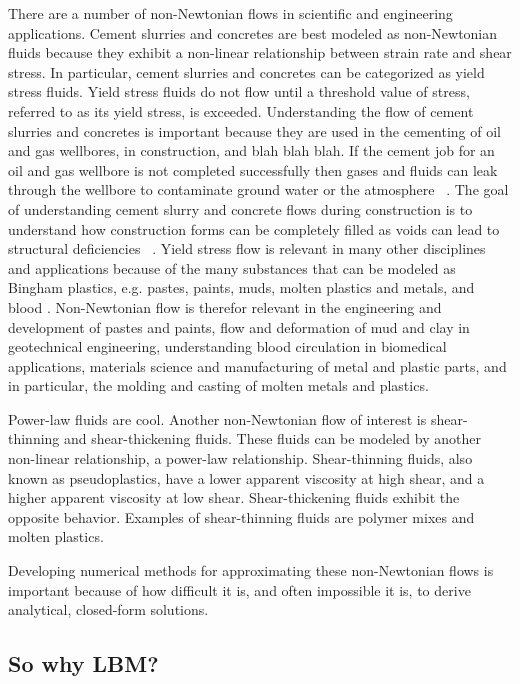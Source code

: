 \documentclass{article}
\begin{document}
There are a number of non-Newtonian flows in scientific and engineering applications.
Cement slurries and concretes are best modeled as non-Newtonian fluids because they exhibit a non-linear relationship between strain rate and shear stress.
In particular, cement slurries and concretes can be categorized as yield stress fluids. 
Yield stress fluids do not flow until a threshold value of stress, referred to as its yield stress, is exceeded.
Understanding the flow of cement slurries and concretes is important because they are used in the cementing of oil and gas wellbores, in construction, and blah blah blah.
If the cement job for an oil and gas wellbore is not completed successfully then gases and fluids can leak through the wellbore to contaminate ground water or the atmosphere ~\cite{grasinger2015simulation}.
The goal of understanding cement slurry and concrete flows during construction is to understand how construction forms can be completely filled as voids can lead to structural deficiencies ~\cite{RARR}.
Yield stress flow is relevant in many other disciplines and applications because of the many substances that can be modeled as Bingham plastics, e.g. pastes, paints, muds, molten plastics and metals, and blood \cite{wang2011lattice}. %
Non-Newtonian flow is therefor relevant in the engineering and development of pastes and paints, flow and deformation of mud and clay in geotechnical engineering, understanding blood circulation in biomedical applications, materials science and manufacturing of metal and plastic parts, and in particular, the molding and casting of molten metals and plastics.

Power-law fluids are cool.
Another non-Newtonian flow of interest is shear-thinning and shear-thickening fluids.
These fluids can be modeled by another non-linear relationship, a power-law relationship.
Shear-thinning fluids, also known as pseudoplastics, have a lower apparent viscosity at high shear, and a higher apparent viscosity at low shear.
Shear-thickening fluids exhibit the opposite behavior.
Examples of shear-thinning fluids are polymer mixes and molten plastics.

Developing numerical methods for approximating these non-Newtonian flows is important because of how difficult it is, and often impossible it is, to derive analytical, closed-form solutions.

\subsection{So why LBM?}
\end{document}
